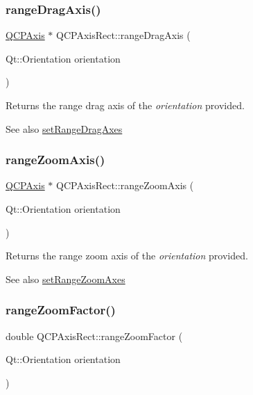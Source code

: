 \subsubsection{\texorpdfstring{range\+Drag\+Axis()}{rangeDragAxis()}}
{\footnotesize\ttfamily \hyperlink{class_q_c_p_axis}{Q\+C\+P\+Axis} $\ast$ Q\+C\+P\+Axis\+Rect\+::range\+Drag\+Axis (\begin{DoxyParamCaption}\item[{Qt\+::\+Orientation}]{orientation }\end{DoxyParamCaption})}

Returns the range drag axis of the {\itshape orientation} provided.

\begin{DoxySeeAlso}{See also}
\hyperlink{class_q_c_p_axis_rect_a648cce336bd99daac4a5ca3e5743775d}{set\+Range\+Drag\+Axes} 
\end{DoxySeeAlso}
\hypertarget{class_q_c_p_axis_rect_a679c63f2b8daccfe6ec5110dce3dd3b6}{}\label{class_q_c_p_axis_rect_a679c63f2b8daccfe6ec5110dce3dd3b6} 
\subsubsection{\texorpdfstring{range\+Zoom\+Axis()}{rangeZoomAxis()}}
{\footnotesize\ttfamily \hyperlink{class_q_c_p_axis}{Q\+C\+P\+Axis} $\ast$ Q\+C\+P\+Axis\+Rect\+::range\+Zoom\+Axis (\begin{DoxyParamCaption}\item[{Qt\+::\+Orientation}]{orientation }\end{DoxyParamCaption})}

Returns the range zoom axis of the {\itshape orientation} provided.

\begin{DoxySeeAlso}{See also}
\hyperlink{class_q_c_p_axis_rect_a9442cca2aa358405f39a64d51eca13d2}{set\+Range\+Zoom\+Axes} 
\end{DoxySeeAlso}
\hypertarget{class_q_c_p_axis_rect_ae4e6c4d143aacc88d2d3c56f117c2fe1}{}\label{class_q_c_p_axis_rect_ae4e6c4d143aacc88d2d3c56f117c2fe1} 
\subsubsection{\texorpdfstring{range\+Zoom\+Factor()}{rangeZoomFactor()}}
{\footnotesize\ttfamily double Q\+C\+P\+Axis\+Rect\+::range\+Zoom\+Factor (\begin{DoxyParamCaption}\item[{Qt\+::\+Orientation}]{orientation }\end{DoxyParamCaption})}

